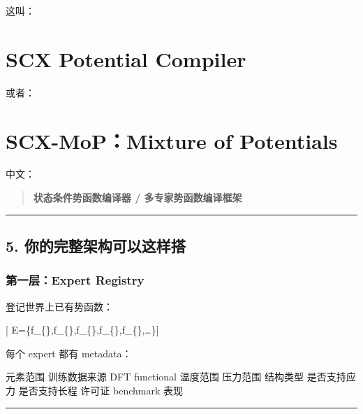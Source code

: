 \documentclass[
  12pt,
]{ctexart}
\newenvironment{Shaded}{}{}
\newcommand{\NormalTok}[1]{#1}
\begin{document}
这叫：

\section{\texorpdfstring{\textbf{SCX Potential
Compiler}}{SCX Potential Compiler}}\label{scx-potential-compiler}

或者：

\section{\texorpdfstring{\textbf{SCX-MoP：Mixture of
Potentials}}{SCX-MoP：Mixture of Potentials}}\label{scx-mopmixture-of-potentials}

中文：

\begin{quote}
\textbf{状态条件势函数编译器 / 多专家势函数编译框架}
\end{quote}

\begin{center}\rule{0.5\linewidth}{0.5pt}\end{center}

\subsection{5.
你的完整架构可以这样搭}\label{ux4f60ux7684ux5b8cux6574ux67b6ux6784ux53efux4ee5ux8fd9ux6837ux642d}

\subsubsection{第一层：Expert
Registry}\label{ux7b2cux4e00ux5c42expert-registry}

登记世界上已有势函数：

{[}
\mathcal E=\{f\_\{\},f\_\{\},f\_\{\},f\_\{\},f\_\{\},\ldots\}{]}

每个 expert 都有 metadata：

\begin{Shaded}
\begin{Highlighting}[]
\NormalTok{元素范围}
\NormalTok{训练数据来源}
\NormalTok{DFT functional}
\NormalTok{温度范围}
\NormalTok{压力范围}
\NormalTok{结构类型}
\NormalTok{是否支持应力}
\NormalTok{是否支持长程}
\NormalTok{许可证}
\NormalTok{benchmark 表现}
\end{Highlighting}
\end{Shaded}

\begin{center}\rule{0.5\linewidth}{0.5pt}\end{center}
\end{document}
